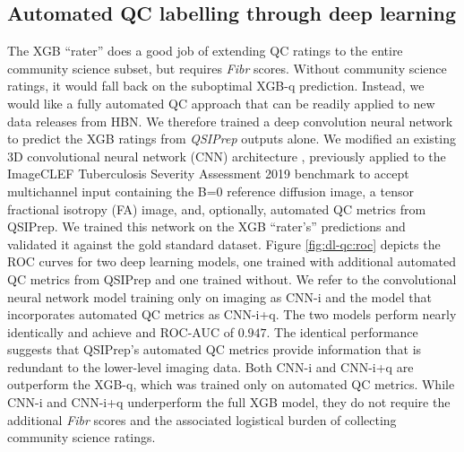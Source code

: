 \documentclass[fleqn,10pt]{wlscirep}
\begin{document}
\subsection*{Automated QC labelling through deep learning}

The XGB ``rater'' does a good job of extending QC ratings to the entire
community science subset, but requires \emph{Fibr} scores. Without community
science ratings, it would fall back on the suboptimal XGB-q prediction. Instead,
we would like a fully automated QC approach that can be readily applied to new
data releases from HBN. We therefore trained a deep convolution neural network
to predict the XGB ratings from \emph{QSIPrep} outputs alone. We modified an
existing 3D convolutional neural network (CNN) architecture \cite{zunair2020-bs},
previously applied to the ImageCLEF Tuberculosis Severity Assessment 2019
benchmark \cite{dicente2019clef} to accept multichannel input containing the
B=0 reference diffusion image, a tensor fractional isotropy (FA) image, and,
optionally, automated QC metrics from QSIPrep. We trained this network on the
XGB ``rater's'' predictions and validated it against the gold standard dataset.
Figure \ref{fig:dl-qc:roc} depicts the ROC curves for two deep learning models,
one trained with additional automated QC metrics from QSIPrep and one trained
without. We refer to the convolutional neural network model training only on
imaging as CNN-i and the model that incorporates automated QC metrics as
CNN-i+q. The two models perform nearly identically and achieve and ROC-AUC of
$0.947$. The identical performance suggests that QSIPrep's automated QC metrics
provide information that is redundant to the lower-level imaging data.
Both CNN-i and CNN-i+q are outperform the XGB-q, which was trained only on
automated QC metrics. While CNN-i and CNN-i+q underperform the full XGB model,
they do not require the additional \emph{Fibr} scores and the associated
logistical burden of collecting community science ratings.
\end{document}
